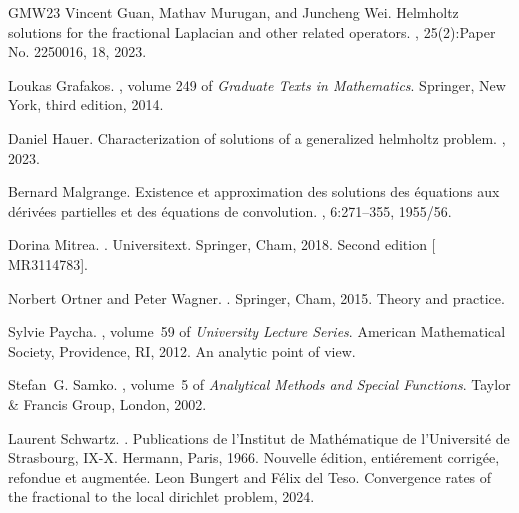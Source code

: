 \documentclass[11pt]{amsart}
\begin{document}
\begin{thebibliography}{GMW23}
Vincent Guan, Mathav Murugan, and Juncheng Wei.
\newblock Helmholtz solutions for the fractional {L}aplacian and other related
  operators.
, 25(2):Paper No. 2250016, 18, 2023.

Loukas Grafakos.
, volume 249 of {\em Graduate Texts
  in Mathematics}.
\newblock Springer, New York, third edition, 2014.

Daniel Hauer.
\newblock Characterization of solutions of a generalized helmholtz problem.
, 2023.

Bernard Malgrange.
\newblock Existence et approximation des solutions des \'{e}quations aux
  d\'{e}riv\'{e}es partielles et des \'{e}quations de convolution.
, 6:271--355, 1955/56.

Dorina Mitrea.
.
\newblock Universitext. Springer, Cham, 2018.
\newblock Second edition [ MR3114783].

Norbert Ortner and Peter Wagner.
.
\newblock Springer, Cham, 2015.
\newblock Theory and practice.

Sylvie Paycha.
, volume~59 of {\em
  University Lecture Series}.
\newblock American Mathematical Society, Providence, RI, 2012.
\newblock An analytic point of view.

Stefan~G. Samko.
, volume~5 of
  {\em Analytical Methods and Special Functions}.
\newblock Taylor \& Francis Group, London, 2002.

Laurent Schwartz.
.
\newblock Publications de l'Institut de Math\'{e}matique de l'Universit\'{e} de
  Strasbourg, IX-X. Hermann, Paris, 1966.
\newblock Nouvelle \'{e}dition, enti\'{e}rement corrig\'{e}e, refondue et
  augment\'{e}e.
Leon Bungert and Félix del Teso.
\newblock Convergence rates of the fractional to the local dirichlet problem,
  2024.
\end{thebibliography}
\end{document}
